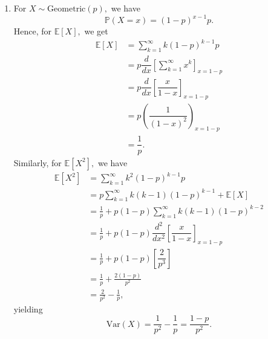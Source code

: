 \documentclass[12pt]{article}
\begin{document}
\begin{enumerate}
\begin{enumerate}
        For $\mathbb E[X^2],$ we get
        \begin{align*}
          \mathbb E[X^2] &= e^{-\lambda}\sum_{k = 1}^{\infty}
          \dfrac{k\lambda^k }{(k-1)!} \\
          &= \lambda e^{-\lambda} \sum_{k = 1}^{\infty} \dfrac{k
          \lambda^{k-1}}{(k-1)!} \\
          &= \lambda e^{-\lambda} \dfrac{d}{dx} \left[
            \sum_{k= 1}^{\infty} \dfrac{x^k}{(k-1)!}
          \right]_{x = \lambda} \\
          &= \lambda e^{-\lambda} \dfrac{d}{dx} \left[
            x \sum_{k= 0}^{\infty} \dfrac{x^k}{k!}
          \right]_{x = \lambda} \\
          &= \lambda e^{-\lambda} \dfrac{d}{dx} \left[
            x e^{x}
          \right]_{x = \lambda} \\
          &= \lambda e^{-\lambda }[e^x (1+x)]_{x = \lambda} \\
          &= \lambda (1 + \lambda),
        \end{align*}
        meaning $\text{Var}(X) = \lambda(1 + \lambda) - \lambda^2 = \lambda.$
      \item For $X \sim \text{Geometric}(p),$ we have
        $$
        \mathbb P(X = x) = (1-p)^{x - 1} p.
        $$
        Hence, for $\mathbb E[X],$ we get
        \begin{align*}
          \mathbb E[X] &= \sum_{k = 1}^{\infty} k (1-p)^{k - 1} p \\
          &= p \dfrac{d}{dx} \left [ \sum_{k = 1}^{\infty} x^k
          \right]_{x = 1 - p} \\
          &= p \dfrac{d}{dx} \left [ \dfrac{x}{1-x}\right]_{x = 1-p} \\
          &= p \left(
            \dfrac{1}{(1-x)^2}
          \right)_{x = 1- p} \\
          &= \dfrac{1}{p}.
        \end{align*}
        Similarly, for $\mathbb E[X^2],$ we have
        \begin{align*}
          \mathbb E[X^2] &= \sum_{k = 1}^{\infty} k^2 (1-p)^{k -1 }p \\
          &= p\sum_{k = 1}^{\infty} k(k-1) (1-p)^{k-1} + \mathbb E[X] \\
          &= \frac{1}{p} + p(1-p) \sum_{k = 1}^{\infty} k(k-1) (1-p)^{k-2} \\
          &= \frac{1}{p}  + p(1-p) \dfrac{d^2}{dx^2} \left [
            \dfrac{x}{1-x}
          \right]_{x = 1-p}  \\
          &= \frac{1}{p} + p(1-p) \left [
            \dfrac{2}{p^3}
          \right] \\
          &= \frac{1}{p} + \frac{2(1-p)}{p^2} \\
          &= \frac{2}{p^2} - \frac{1}{p},
        \end{align*}
        yielding
        $$
        \text{Var}(X) = \frac{1}{p^2} - \frac{1}{p} = \frac{1-p}{p^2}.
        $$
    \end{enumerate}


\end{enumerate}
\end{document}

